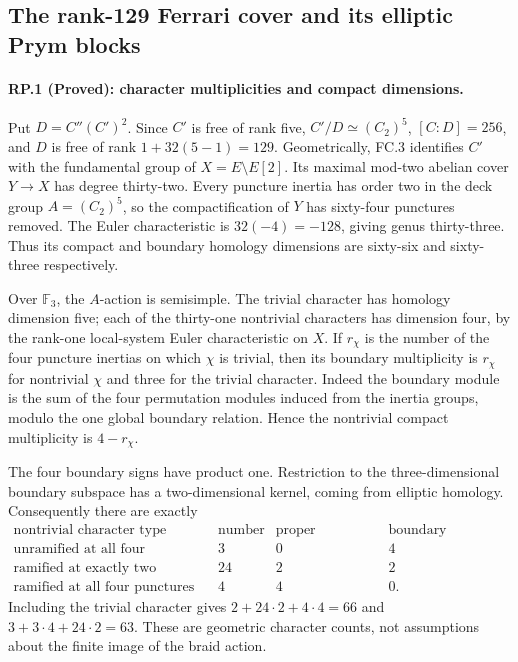 \subsection*{The rank-129 Ferrari cover and its elliptic Prym blocks}

\paragraph{RP.1 (Proved): character multiplicities and compact dimensions.}
Put $D=C''(C')^2$. Since $C'$ is free of rank five,
$C'/D\simeq(C_2)^5$, $[C:D]=256$, and $D$ is free
of rank $1+32(5-1)=129$. Geometrically, FC.3 identifies
$C'$ with the fundamental group of
$X=E\setminus E[2]$. Its maximal mod-two abelian cover
$Y\to X$ has degree thirty-two. Every puncture inertia
has order two in the deck group $A=(C_2)^5$, so the
compactification of $Y$ has sixty-four punctures removed.
The Euler characteristic is $32(-4)=-128$, giving genus
thirty-three. Thus its compact and boundary homology
dimensions are sixty-six and sixty-three respectively.

Over $\mathbb F_3$, the $A$-action is semisimple. The
trivial character has homology dimension five; each
of the thirty-one nontrivial characters has dimension
four, by the rank-one local-system Euler characteristic
on $X$. If $r_\chi$ is the number of the four puncture
inertias on which $\chi$ is trivial, then its boundary
multiplicity is $r_\chi$ for nontrivial $\chi$ and three
for the trivial character. Indeed the boundary module
is the sum of the four permutation modules induced from
the inertia groups, modulo the one global boundary
relation. Hence the nontrivial compact multiplicity is
$4-r_\chi$.

The four boundary signs have product one. Restriction
to the three-dimensional boundary subspace has a
two-dimensional kernel, coming from elliptic homology.
Consequently there are exactly
\[
\begin{array}{c|c|c|c}
\text{nontrivial character type}&\text{number}&
 \text{proper dimension}&\text{boundary dimension}\\ \hline
\text{unramified at all four punctures}&3&0&4\\
\text{ramified at exactly two punctures}&24&2&2\\
\text{ramified at all four punctures}&4&4&0.
\end{array}
 \tag{RP.1a}
\]
Including the trivial character gives
$2+24\cdot2+4\cdot4=66$ and
$3+3\cdot4+24\cdot2=63$. These are geometric
character counts, not assumptions about the finite
image of the braid action.

